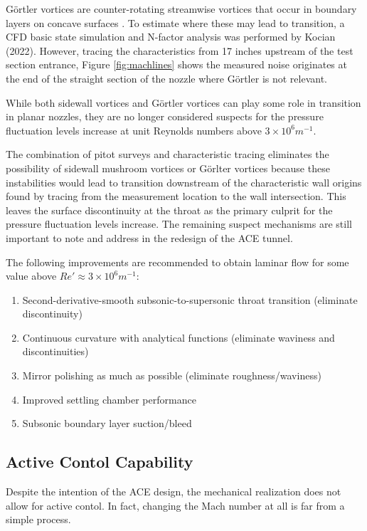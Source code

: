Görtler vortices are counter-rotating streamwise vortices that occur in boundary layers on concave surfaces \cite{saric}. To estimate where these may lead to transition, a CFD basic state simulation and N-factor analysis was performed by Kocian (2022). However, tracing the characteristics from 17 inches upstream of the test section entrance, Figure \ref{fig:machlines} shows the measured noise originates at the end of the straight section of the nozzle where Görtler is not relevant.

While both sidewall vortices and Görtler vortices can play some role in transition in planar nozzles, they are no longer considered suspects for the pressure fluctuation levels increase at unit Reynolds numbers above $3 \times 10^6 m^{-1}$.

The combination of pitot surveys and characteristic tracing eliminates the possibility of sidewall mushroom vortices or Görlter vortices because these instabilities would lead to transition downstream of the characteristic wall origins found by tracing from the measurement location to the wall intersection. This leaves the surface discontinuity at the throat as the primary culprit for the pressure fluctuation levels increase. The remaining suspect mechanisms are still important to note and address in the redesign of the ACE tunnel.

The following improvements are recommended to obtain laminar flow for some value above $Re' \approx 3 \times 10^6 m^{-1}$:
\begin{enumerate}
    \item Second-derivative-smooth subsonic-to-supersonic throat transition (eliminate discontinuity)
    \item Continuous curvature with analytical functions (eliminate waviness and discontinuities)
    \item Mirror polishing as much as possible (eliminate roughness/waviness)
    \item Improved settling chamber performance
    \item Subsonic boundary layer suction/bleed
\end{enumerate}

\subsection{Active Contol Capability}

Despite the intention of the ACE design, the mechanical realization does not allow for active contol. In fact, changing the Mach number at all is far from a simple process. 

